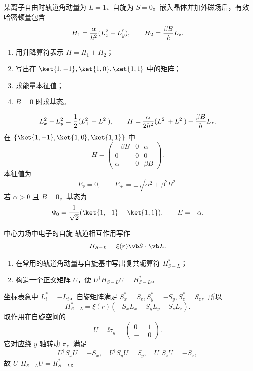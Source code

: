 \begin{question}
某离子自由时轨道角动量为 $L=1$、自旋为 $S=0$。嵌入晶体并加外磁场后，有效哈密顿量包含
\[
  H_1={\alpha\over\hbar^2}(L_x^2-L_y^2),
  \qquad H_2={\beta B\over\hbar}L_z.
\]
\begin{enumerate}
  \item 用升降算符表示 $H=H_1+H_2$；
  \item 写出在 $\ket{1,-1},\ket{1,0},\ket{1,1}$ 中的矩阵；
  \item 求能量本征值；
  \item $B=0$ 时求基态。
\end{enumerate}
\begin{solution}
\[
  L_x^2-L_y^2={1\over2}(L_+^2+L_-^2),
  \qquad H={\alpha\over2\hbar^2}(L_+^2+L_-^2)+{\beta B\over\hbar}L_z.
\]
在 $\{\ket{1,-1},\ket{1,0},\ket{1,1}\}$ 中
\[
  H=\begin{pmatrix}
  -\beta B&0&\alpha\\
  0&0&0\\
  \alpha&0&\beta B
  \end{pmatrix}.
\]
本征值为
\[
  E_0=0,
  \qquad E_\pm=\pm\sqrt{\alpha^2+\beta^2B^2}.
\]
若 $\alpha>0$ 且 $B=0$，基态为
\[
  \Phi_0={1\over\sqrt2}(\ket{1,-1}-\ket{1,1}),
  \qquad E=-\alpha.
\]
\end{solution}
\end{question}

\begin{question}
中心力场中电子的自旋-轨道相互作用写作
\[
  H_{S-L}=\xi(r)\vb S\cdot\vb L.
\]
\begin{enumerate}
  \item 在常用的轨道角动量与自旋基中写出复共轭算符 $H_{S-L}^*$；
  \item 构造一个正交矩阵 $U$，使 $U^\dagger H_{S-L}U=H_{S-L}^*$。
\end{enumerate}
\begin{solution}
坐标表象中 $L_i^*=-L_i$。自旋矩阵满足 $S_x^*=S_x,S_y^*=-S_y,S_z^*=S_z$，所以
\[
  H_{S-L}^*=\xi(r)(-S_xL_x+S_yL_y-S_zL_z).
\]
取作用在自旋空间的
\[
  U=\ii\sigma_y=
  \begin{pmatrix}0&1\\-1&0\end{pmatrix}.
\]
它对应绕 $y$ 轴转动 $\pi$，满足
\[
  U^\dagger S_xU=-S_x,
  \quad U^\dagger S_yU=S_y,
  \quad U^\dagger S_zU=-S_z,
\]
故 $U^\dagger H_{S-L}U=H_{S-L}^*$。
\end{solution}
\end{question}
